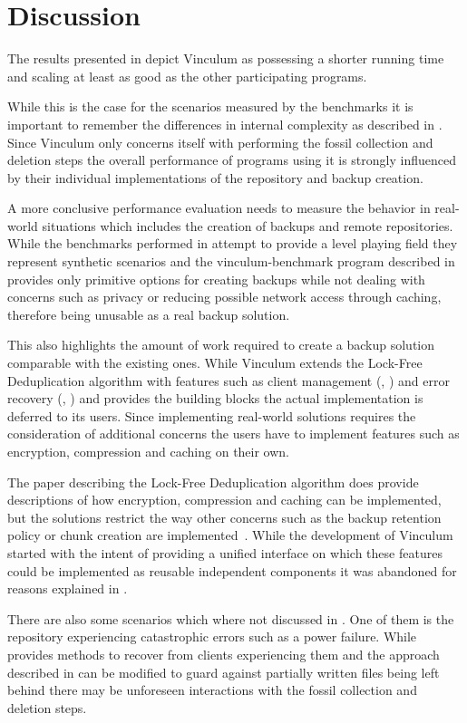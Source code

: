 \chapter{Discussion}\label{ch:discussion}

The results presented in  depict Vinculum as possessing a
shorter running time and scaling at least as good as the other participating programs.

While this is the case for the scenarios measured by the benchmarks it is important
to remember the differences in internal complexity as described in .
Since Vinculum only concerns itself with performing the fossil collection and deletion
steps the overall performance of programs using it is strongly influenced by their
individual implementations of the repository and backup creation.

A more conclusive performance evaluation needs to measure the behavior in real-world
situations which includes the creation of backups and remote repositories.
While the benchmarks performed in  attempt to provide a
level playing field they represent synthetic scenarios and the vinculum-benchmark
program described in  provides only primitive options
for creating backups while not dealing with concerns such as privacy or reducing
possible network access through caching, therefore being unusable as a real backup
solution.

This also highlights the amount of work required to create a backup solution
comparable with the existing ones.
While Vinculum extends the Lock-Free Deduplication algorithm with features
such as client management (, )
and error recovery (, )
and provides the building blocks the actual implementation is deferred to its users.
Since implementing real-world solutions requires the consideration of additional
concerns the users have to implement features such as encryption, compression and
caching on their own.

The paper describing the Lock-Free Deduplication algorithm does provide
descriptions of how encryption, compression and caching can be implemented, but
the solutions restrict the way other concerns such as the backup retention policy
or chunk creation are
implemented~\cite[sections `Caching' and `Compression and Encryption']{Duplicacy}.
While the development of Vinculum started with the intent of providing a unified
interface on which these features could be implemented as reusable independent
components it was abandoned for reasons explained in .

There are also some scenarios which where not discussed in .
One of them is the repository experiencing catastrophic errors such as a power
failure.
While  provides methods to recover from clients experiencing
them and the approach described in  can be modified to guard
against partially written files being left behind there may be unforeseen interactions
with the fossil collection and deletion steps.
